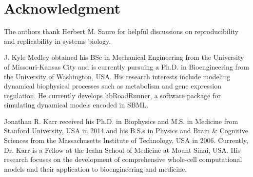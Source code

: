 \documentclass[journal,transmag,twoside]{IEEEtran}
\begin{document}
\section{Acknowledgment}

The authors thank Herbert M. Sauro for helpful discussions
on reproducibility and replicability in systems biology.

\ifCLASSOPTIONcaptionsoff
  \newpage
\fi




\begin{IEEEbiography}{J. Kyle Medley}
obtained his BSc in Mechanical Engineering from the University of Missouri-Kansas City and
is currently pursuing a Ph.D. in Bioengineering from the University of Washington, USA.
His research interests include modeling dynamical biophysical processes such as
metabolism and gene expression regulation.
He currently develops libRoadRunner, a software package for simulating dynamical models encoded in SBML.
\end{IEEEbiography}

\begin{IEEEbiography}{Jonathan R. Karr}
received his Ph.D. in Biophysics and M.S. in Medicine from Stanford University, USA in 2014 and his B.S.s in Physics and Brain \& Cognitive Sciences from the Massachusetts Institute of Technology, USA in 2006. Currently, Dr. Karr is a Fellow at the Icahn School of Medicine at Mount Sinai, USA. His research focuses on the development of comprehensive whole-cell computational models and their application to bioengineering and medicine.
\end{IEEEbiography}

\vfill
\end{document}
